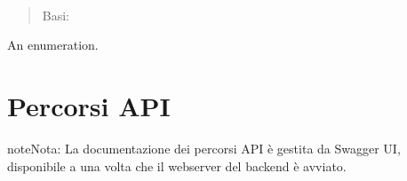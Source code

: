 \documentclass[letterpaper,10pt,italian]{sphinxmanual}
\begin{document}

\begin{fulllineitems}
\label{\detokenize{code/backend/index:nest_backend.database.tables.ConditionMode}}~\begin{quote}

\sphinxAtStartPar
Basi: 
\end{quote}

\sphinxAtStartPar
An enumeration.

\begin{fulllineitems}
\label{\detokenize{code/backend/index:nest_backend.database.tables.ConditionMode.all_or}}
\end{fulllineitems}


\begin{fulllineitems}
\label{\detokenize{code/backend/index:nest_backend.database.tables.ConditionMode.all_and}}
\end{fulllineitems}


\end{fulllineitems}



\section{ \sphinxhyphen{} Percorsi API}
\label{\detokenize{code/backend/index:routes-percorsi-api}}
\begin{sphinxadmonition}{note}{Nota:}
\sphinxAtStartPar
La documentazione dei percorsi API è gestita da Swagger UI, disponibile a  una volta che il webserver
del backend è avviato.
\end{sphinxadmonition}
\end{document}
